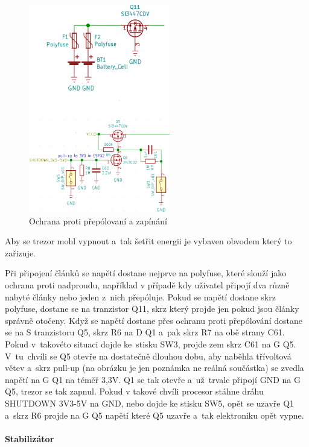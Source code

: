 \begin{figure}
    \centering
    \includegraphics[width=0.55\textwidth]{kapitoly/obrazky/E4/napajeni/ochrana_proti_prepolovani_a_zapinani.png}
    \caption{\label{fig:frog1}Ochrana proti přepólovaní a zapínání}
\end{figure}
Aby se trezor mohl vypnout a~tak šetřit energii je vybaven obvodem který to zařizuje.

Při připojení článků se napětí dostane nejprve na polyfuse, které slouží jako ochrana proti nadproudu, například v případě kdy uživatel připojí dva 
různě nabyté články nebo jeden z~nich přepóluje.
Pokud se napětí dostane skrz polyfuse, dostane se na tranzistor Q11, skrz který projde jen pokud jsou články správně otočeny.
Když se napětí dostane přes ochranu proti přepólování dostane se na S tranzistoru Q5, skrz R6 na D Q1 a~pak skrz R7 na obě strany C61.
Pokud v~takovéto situaci dojde ke~stisku SW3, projde zem skrz C61 na G Q5. V~tu~chvíli se Q5 otevře na dostatečně dlouhou dobu, 
aby naběhla třívoltová větev a~skrz pull-up (na obrázku je jen poznámka ne reálná součástka) se zvedla napětí na G Q1 na téměř 3,3V. 
Q1 se tak otevře a~už~trvale připojí GND na G Q5, trezor se tak zapnul. Pokud v takové chvíli procesor stáhne dráhu SHUTDOWN 3V3-5V 
na GND, nebo dojde ke stisku SW5, opět se uzavře Q1 a~skrz R6 projde na G Q5 napětí které Q5 uzavře a~tak elektroniku opět vypne.

\newpage

\paragraph*{Stabilizátor}

